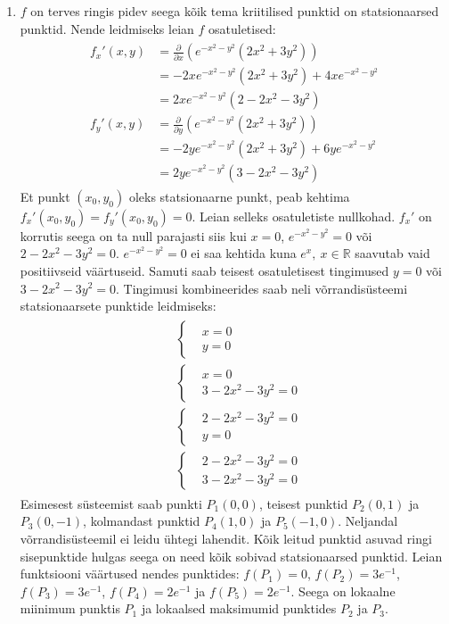 \documentclass{article}
\newcommand{\p}[1]{\frac{\partial}{\partial #1}}
\begin{document}
\begin{enumerate}
\item $f$ on terves ringis pidev seega kõik tema kriitilised punktid on statsionaarsed punktid. Nende leidmiseks leian $f$ osatuletised:
\begin{gather*}
\begin{aligned}
f_x'(x,y)&=\p{x}\left(e^{-x^2-y^2}(2x^2+3y^2)\right)\\
&=-2xe^{-x^2-y^2}(2x^2+3y^2)+4xe^{-x^2-y^2}\\
&=2xe^{-x^2-y^2}(2-2x^2-3y^2)\\
f_y'(x,y)&=\p{y}\left(e^{-x^2-y^2}(2x^2+3y^2)\right)\\
&=-2ye^{-x^2-y^2}(2x^2+3y^2)+6ye^{-x^2-y^2}\\
&=2ye^{-x^2-y^2}(3-2x^2-3y^2)
\end{aligned}
\end{gather*}
Et punkt $(x_0,y_0)$ oleks statsionaarne punkt, peab kehtima $f_x'(x_0,y_0)=f_y'(x_0,y_0)=0$. Leian selleks osatuletiste nullkohad. $f_x'$ on korrutis seega on ta null parajasti siis kui $x=0$, $e^{-x^2-y^2}=0$ või $2-2x^2-3y^2=0$. $e^{-x^2-y^2}=0$ ei saa kehtida kuna $e^x,\ x\in\mathbb{R}$ saavutab vaid positiivseid väärtuseid. Samuti saab teisest osatuletisest tingimused $y=0$ või $3-2x^2-3y^2=0$. Tingimusi kombineerides saab neli võrrandisüsteemi statsionaarsete punktide leidmiseks:
\begin{gather*}
\begin{aligned}
&\left\{
\begin{aligned}
&x=0\\
&y=0
\end{aligned}
\right.\\
&\left\{
\begin{aligned}
&x=0\\
&3-2x^2-3y^2=0
\end{aligned}
\right.\\
&\left\{
\begin{aligned}
&2-2x^2-3y^2=0\\
&y=0
\end{aligned}
\right.\\
&\left\{
\begin{aligned}
&2-2x^2-3y^2=0\\
&3-2x^2-3y^2=0
\end{aligned}
\right.
\end{aligned}
\end{gather*}
Esimesest süsteemist saab punkti $P_1(0,0)$, teisest punktid $P_2(0,1)$ ja $P_3(0,-1)$, kolmandast punktid $P_4(1,0)$ ja $P_5(-1,0)$. Neljandal võrrandisüsteemil ei leidu ühtegi lahendit. Kõik leitud punktid asuvad ringi sisepunktide hulgas seega on need kõik sobivad statsionaarsed punktid. Leian funktsiooni väärtused nendes punktides: $f(P_1)=0$, $f(P_2)=3e^{-1}$, $f(P_3)=3e^{-1}$, $f(P_4)=2e^{-1}$ ja $f(P_5)=2e^{-1}$. Seega on lokaalne miinimum punktis $P_1$ ja lokaalsed maksimumid punktides $P_2$ ja $P_3$.

\end{enumerate}
\end{document}
